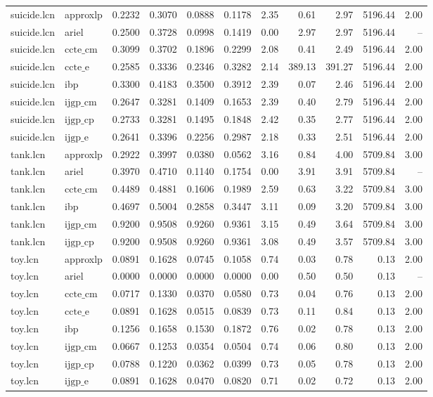 \begin{table}[ht]
\begin{tabular}{llrrrrrrrrr}
suicide.lcn & approxlp & 0.2232 & 0.3070 & 0.0888 & 0.1178 & 2.35 & 0.61 & 2.97 & 5196.44 & 2.00 \\
suicide.lcn & ariel & 0.2500 & 0.3728 & 0.0998 & 0.1419 & 0.00 & 2.97 & 2.97 & 5196.44 & -- \\
suicide.lcn & $\text{ccte\_cm}$ & 0.3099 & 0.3702 & 0.1896 & 0.2299 & 2.08 & 0.41 & 2.49 & 5196.44 & 2.00 \\
suicide.lcn & $\text{ccte\_e}$ & 0.2585 & 0.3336 & 0.2346 & 0.3282 & 2.14 & 389.13 & 391.27 & 5196.44 & 2.00 \\
suicide.lcn & ibp & 0.3300 & 0.4183 & 0.3500 & 0.3912 & 2.39 & 0.07 & 2.46 & 5196.44 & 2.00 \\
suicide.lcn & $\text{ijgp\_cm}$ & 0.2647 & 0.3281 & 0.1409 & 0.1653 & 2.39 & 0.40 & 2.79 & 5196.44 & 2.00 \\
suicide.lcn & $\text{ijgp\_cp}$ & 0.2733 & 0.3281 & 0.1495 & 0.1848 & 2.42 & 0.35 & 2.77 & 5196.44 & 2.00 \\
suicide.lcn & $\text{ijgp\_e}$ & 0.2641 & 0.3396 & 0.2256 & 0.2987 & 2.18 & 0.33 & 2.51 & 5196.44 & 2.00 \\
tank.lcn & approxlp & 0.2922 & 0.3997 & 0.0380 & 0.0562 & 3.16 & 0.84 & 4.00 & 5709.84 & 3.00 \\
tank.lcn & ariel & 0.3970 & 0.4710 & 0.1140 & 0.1754 & 0.00 & 3.91 & 3.91 & 5709.84 & -- \\
tank.lcn & $\text{ccte\_cm}$ & 0.4489 & 0.4881 & 0.1606 & 0.1989 & 2.59 & 0.63 & 3.22 & 5709.84 & 3.00 \\
tank.lcn & ibp & 0.4697 & 0.5004 & 0.2858 & 0.3447 & 3.11 & 0.09 & 3.20 & 5709.84 & 3.00 \\
tank.lcn & $\text{ijgp\_cm}$ & 0.9200 & 0.9508 & 0.9260 & 0.9361 & 3.15 & 0.49 & 3.64 & 5709.84 & 3.00 \\
tank.lcn & $\text{ijgp\_cp}$ & 0.9200 & 0.9508 & 0.9260 & 0.9361 & 3.08 & 0.49 & 3.57 & 5709.84 & 3.00 \\
toy.lcn & approxlp & 0.0891 & 0.1628 & 0.0745 & 0.1058 & 0.74 & 0.03 & 0.78 & 0.13 & 2.00 \\
toy.lcn & ariel & 0.0000 & 0.0000 & 0.0000 & 0.0000 & 0.00 & 0.50 & 0.50 & 0.13 & -- \\
toy.lcn & $\text{ccte\_cm}$ & 0.0717 & 0.1330 & 0.0370 & 0.0580 & 0.73 & 0.04 & 0.76 & 0.13 & 2.00 \\
toy.lcn & $\text{ccte\_e}$ & 0.0891 & 0.1628 & 0.0515 & 0.0839 & 0.73 & 0.11 & 0.84 & 0.13 & 2.00 \\
toy.lcn & ibp & 0.1256 & 0.1658 & 0.1530 & 0.1872 & 0.76 & 0.02 & 0.78 & 0.13 & 2.00 \\
toy.lcn & $\text{ijgp\_cm}$ & 0.0667 & 0.1253 & 0.0354 & 0.0504 & 0.74 & 0.06 & 0.80 & 0.13 & 2.00 \\
toy.lcn & $\text{ijgp\_cp}$ & 0.0788 & 0.1220 & 0.0362 & 0.0399 & 0.73 & 0.05 & 0.78 & 0.13 & 2.00 \\
toy.lcn & $\text{ijgp\_e}$ & 0.0891 & 0.1628 & 0.0470 & 0.0820 & 0.71 & 0.02 & 0.72 & 0.13 & 2.00 \\
\bottomrule
\end{tabular}
\end{table}

